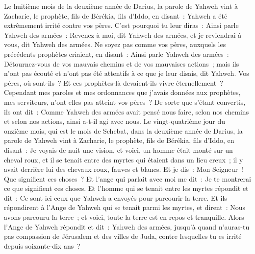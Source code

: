 \begin{multicols}{2}
\VerseOne{}Le huitième mois de la deuxième année de Darius, la parole de Yahweh vint à Zacharie, le prophète, fils de Bérékia, fils d'Iddo, en disant~:
Yahweh a été extrêmement irrité contre vos pères.
C'est pourquoi tu leur diras~: Ainsi parle Yahweh des armées~: Revenez à moi, dit Yahweh des armées, et je reviendrai à vous, dit Yahweh des armées.
Ne soyez pas comme vos pères, auxquels les précédents prophètes criaient, en disant~: Ainsi parle Yahweh des armées~: Détournez-vous de vos mauvais chemins et de vos mauvaises actions~; mais ils n'ont pas écouté et n'ont pas été attentifs à ce que je leur disais, dit Yahweh.
Vos pères, où sont-ils~? Et ces prophètes-là devaient-ils vivre éternellement~?
Cependant mes paroles et mes ordonnances que j'avais données aux prophètes, mes serviteurs, n'ont-elles pas atteint vos pères~? De sorte que s'étant convertis, ils ont dit~: Comme Yahweh des armées avait pensé nous faire, selon nos chemins et selon nos actions, ainsi a-t-il agi avec nous.
Le vingt-quatrième jour du onzième mois, qui est le mois de Schebat, dans la deuxième année de Darius, la parole de Yahweh vint à Zacharie, le prophète, fils de Bérékia, fils d'Iddo, en disant~:
Je voyais de nuit une vision, et voici, un homme était monté sur un cheval roux, et il se tenait entre des myrtes qui étaient dans un lieu creux~; il y avait derrière lui des chevaux roux, fauves et blancs.
Et je dis~: Mon Seigneur~! Que signifient ces choses~? Et l'ange qui parlait avec moi me dit~: Je te montrerai ce que signifient ces choses.
Et l'homme qui se tenait entre les myrtes répondit et dit~: Ce sont ici ceux que Yahweh a envoyés pour parcourir la terre.
Et ils répondirent à l'Ange de Yahweh qui se tenait parmi les myrtes, et dirent~: Nous avons parcouru la terre~; et voici, toute la terre est en repos et tranquille.
Alors l'Ange de Yahweh répondit et dit~: Yahweh des armées, jusqu'à quand n'auras-tu pas compassion de Jérusalem et des villes de Juda, contre lesquelles tu es irrité depuis soixante-dix ans~?

\end{multicols}
